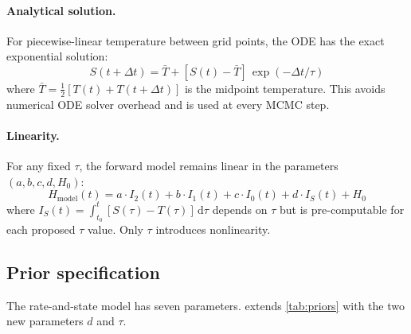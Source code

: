 \documentclass[11pt]{article}
\begin{document}
\paragraph{Analytical solution.}  For piecewise-linear temperature between grid points, the ODE has the exact exponential solution:
\begin{equation}
  S(t + \Delta t) = \bar{T} + [S(t) - \bar{T}]\,\exp(-\Delta t / \tau)
  \label{eq:ode_solution}
\end{equation}
where $\bar{T} = \frac{1}{2}[T(t) + T(t+\Delta t)]$ is the midpoint temperature.  This avoids numerical ODE solver overhead and is used at every MCMC step.

\paragraph{Linearity.}  For any fixed $\tau$, the forward model remains linear in the parameters $(a, b, c, d, H_0)$:
\begin{equation}
  H_{\text{model}}(t) = a \cdot I_2(t) + b \cdot I_1(t) + c \cdot I_0(t) + d \cdot I_S(t) + H_0
  \label{eq:state_linear}
\end{equation}
where $I_S(t) = \int_{t_0}^{t} [S(\tau) - T(\tau)]\,\mathrm{d}\tau$ depends on $\tau$ but is pre-computable for each proposed $\tau$ value.  Only $\tau$ introduces nonlinearity.

\subsection{Prior specification}

The rate-and-state model has seven parameters.   extends \cref{tab:priors} with the two new parameters $d$ and $\tau$.
\end{document}
